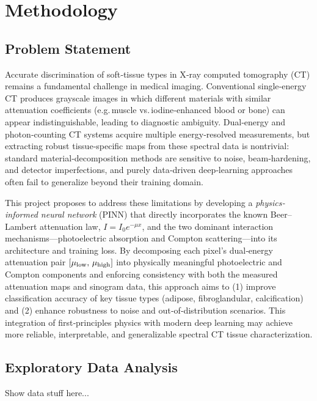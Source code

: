 \section{Methodology}

\subsection{Problem Statement}\label{subsec:problem_Statement}

Accurate discrimination of soft‐tissue types in X‐ray computed tomography (CT) remains a
fundamental challenge in medical imaging. Conventional single‐energy CT produces grayscale
images in which different materials with similar attenuation coefficients (e.g.\,muscle 
vs.\,iodine‐enhanced blood or bone) can appear indistinguishable, leading to diagnostic 
ambiguity. Dual‐energy and photon‐counting CT systems acquire multiple energy‐resolved 
measurements, but extracting robust tissue‐specific maps from these spectral data is 
nontrivial: standard material‐decomposition methods are sensitive to noise, beam‐hardening, 
and detector imperfections, and purely data‐driven deep‐learning approaches often fail to 
generalize beyond their training domain.

This project proposes to address these limitations by developing a \emph{physics‐informed neural network} 
(PINN) that directly incorporates the known Beer–Lambert attenuation law, $I = I_0 e^{-\mu x}$, and the
two dominant interaction mechanisms—photoelectric absorption and Compton scattering—into its architecture 
and training loss. By decomposing each pixel’s dual‐energy attenuation pair \([\mu_{\rm low},\,
\mu_{\rm high}]\) into physically meaningful photoelectric and Compton components and enforcing 
consistency with both the measured attenuation maps and sinogram data, this approach aims to (1)
improve classification accuracy of key tissue types (adipose, fibroglandular, calcification) and (2) 
enhance robustness to noise and out‐of‐distribution scenarios. This integration of first‐principles 
physics with modern deep learning may achieve more reliable, interpretable, and generalizable 
spectral CT tissue characterization.

\subsection{Exploratory Data Analysis}\label{sec:exploratory_data_analysis}

Show data stuff here...

